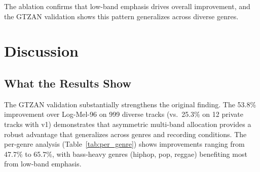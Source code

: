 \documentclass[twocolumn]{article}
\begin{document}
\begin{table}[t]
\centering
\caption{Ablation study: alternative bin allocations (12-track set). $\Delta$ shows improvement over Mel-96 per band.}
\label{tab:ablation}
\small
{}
\end{table}

The ablation confirms that low-band emphasis drives overall improvement, and the GTZAN validation shows this pattern generalizes across diverse genres.

\section{Discussion}

\subsection{What the Results Show}

The GTZAN validation substantially strengthens the original finding. The 53.8\% improvement over Log-Mel-96 on 999 diverse tracks (vs.\ 25.3\% on 12 private tracks with v1) demonstrates that asymmetric multi-band allocation provides a robust advantage that generalizes across genres and recording conditions. The per-genre analysis (Table~\ref{tab:per_genre}) shows improvements ranging from 47.7\% to 65.7\%, with bass-heavy genres (hiphop, pop, reggae) benefiting most from low-band emphasis.
\end{document}

